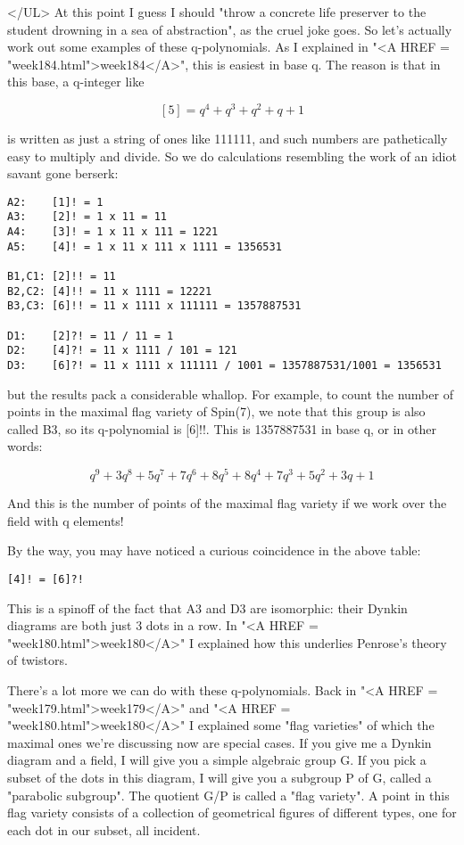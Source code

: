 </UL>
At this point I guess I should "throw a concrete life preserver to
the student drowning in a sea of abstraction", as the cruel joke
goes.  So let's actually work out some examples of these q-polynomials.
As I explained in "<A HREF = "week184.html">week184</A>", this
is easiest in base q.  The reason is that in this base, a q-integer like

$$
[5] = q^{4} + q^{3} + q^{2} + q + 1
$$
    
is written as just a string of ones like 111111, and such numbers 
are pathetically easy to multiply and divide.  So we do calculations
resembling the work of an idiot savant gone berserk:

\begin{verbatim}
A2:    [1]! = 1
A3:    [2]! = 1 x 11 = 11
A4:    [3]! = 1 x 11 x 111 = 1221
A5:    [4]! = 1 x 11 x 111 x 1111 = 1356531

B1,C1: [2]!! = 11
B2,C2: [4]!! = 11 x 1111 = 12221
B3,C3: [6]!! = 11 x 1111 x 111111 = 1357887531

D1:    [2]?! = 11 / 11 = 1
D2:    [4]?! = 11 x 1111 / 101 = 121
D3:    [6]?! = 11 x 1111 x 111111 / 1001 = 1357887531/1001 = 1356531
\end{verbatim}
    
but the results pack a considerable whallop.  For example, to count
the number of points in the maximal flag variety of Spin(7), we note 
that this group is also called B3, so its q-polynomial is [6]!!.  This 
is 1357887531 in base q, or in other words:

$$
q^{9} + 3q^{8} + 5q^{7} + 7q^{6} + 8q^{5} + 8q^{4} + 7q^{3} + 5q^{2} + 3q + 1 
$$
    
And this is the number of points of the maximal flag variety if
we work over the field with q elements!  

By the way, you may have noticed a curious coincidence in the 
above table: 

\begin{verbatim}
[4]! = [6]?!
\end{verbatim}
    
This is a spinoff of the fact that A3 and D3 are isomorphic: their
Dynkin diagrams are both just 3 dots in a row.  In "<A HREF =
"week180.html">week180</A>" I explained how this underlies
Penrose's theory of twistors.

There's a lot more we can do with these q-polynomials.  Back in "<A
HREF = "week179.html">week179</A>" and "<A HREF =
"week180.html">week180</A>" I explained some "flag
varieties" of which the maximal ones we're discussing now are
special cases.  If you give me a Dynkin diagram and a field, I will give
you a simple algebraic group G.  If you pick a subset of the dots in
this diagram, I will give you a subgroup P of G, called a
"parabolic subgroup".  The quotient G/P is called a "flag
variety".  A point in this flag variety consists of a collection of
geometrical figures of different types, one for each dot in our subset,
all incident.

